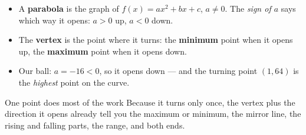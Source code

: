 \documentclass[aspectratio=169, 11pt]{beamer}
\begin{document}
\begin{frame}[t, plain]
  \begin{itemize}\setlength{\itemsep}{5pt}
    \item A \textbf{parabola} is the graph of $f(x)=ax^2+bx+c$, $a\ne0$. The \emph{sign of $a$}
          says which way it opens: $a>0$ up, $a<0$ down.
    \item The \textbf{vertex} is the point where it turns: the \textbf{minimum} point when it
          opens up, the \textbf{maximum} point when it opens down.
    \item Our ball: $a=-16<0$, so it opens down --- and the turning point $(1,64)$ is the
          \emph{highest} point on the curve.
  \end{itemize}
  \vspace{3pt}
  \begin{block}{One point does most of the work}
    Because it turns only once, the vertex plus the direction it opens already tell you the
    maximum or minimum, the mirror line, the rising and falling parts, the range, and both ends.
  \end{block}
\end{frame}
\end{document}
